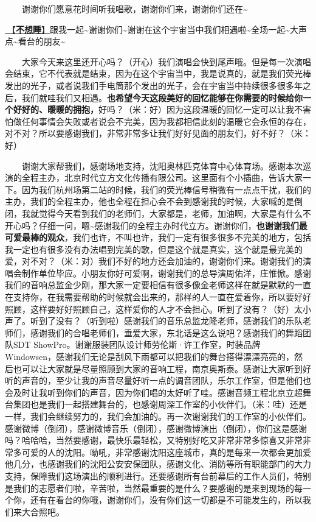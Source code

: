 \documentclass[]{ctexbook}
\begin{document}
  谢谢你们愿意花时间听我唱歌，谢谢你们来，谢谢你们还在\textasciitilde{}

\hyperref[donot-want-to-sleep]{🎵【\textbf{不想睡}】}跟我一起\textasciitilde 谢谢你们\textasciitilde 谢谢在这个宇宙当中我们相遇啦\textasciitilde 全场一起\textasciitilde 大声点\textasciitilde 看台的朋友\textasciitilde{}

  大家今天来这里还开心吗？（开心）我们演唱会快到尾声哦。但是每一次演唱会结束，它不代表就是结束，因为在这个宇宙当中，我是说真的，就是我们荧光棒发出的光子，或者说我们手电筒那个发出的光子，会在宇宙当中持续很多很多年之后，我们就哇我们又相遇。\textbf{也希望今天这段美好的回忆能够在你需要的时候给你一个好好的、暖暖的拥抱，}好吗？（米：好）因为这段温暖的回忆一定可以让我不害怕做任何事情会失败或者说会不完美，因为我都相信此刻的温暖它会永恒的存在，对不对？所以要感谢我们，非常非常多让我们好好见面的朋友们，好不好？（米：好）

  谢谢大家帮我们，感谢场地支持，沈阳奥林匹克体育中心体育场。感谢本次巡演的全程主办，北京时代立方文化传播有限公司。这里面有个小插曲，告诉大家一下。因为我们杭州场第二站的时候，我们的荧光棒信号稍微有一点点干扰，我们的主办，我们的全程主办，他也全程在担心会不会到感谢我的时候，大家喊的是倒闭，我就觉得今天看到我们的老师们，大家都是，老师，加油啊，大家是有什么不开心吗？仔细一问，嗯\textasciitilde 感谢我们的全程主办时代立方。谢谢你们，\textbf{也谢谢我们最可爱最棒的观众}，我们也许，不叫也许，我们一定有很多很多不完美的地方，包括我一定也有很多没有办法唱到完美的歌，但是这个就是真实，这个就是最完美的爱，对不对？（米：对）我们不好的地方还会加油的，谢谢你们来。谢谢我们的演唱会制作单位毕应。小朋友你好可爱啊，谢谢我们的总导演周佑洋，庄惟惞。感谢我们的音响总监金少刚，那大家一定要相信有很多像金老师这样在就是默默的一直在支持你，在我需要帮助的时候就会出来的，那样的人一直在爱着你，所以要好好照顾，这样要好好照顾自己，这样爱你的人才不会担心。听到了没有？（好）太小声了。听到了没有？（听到啦）感谢我们的音乐总监龙隆老师，感谢我们的乐队老师们，感谢我们的合唱老师们，垂爱大家，东北话是这么说吧？感谢我们的舞蹈团队SDT ShowPro。谢谢服装团队设计师劳伦斯·许工作室，时装品牌Windowsen，感谢我们无论是刮风下雨都可以把我们的舞台搭得漂漂亮亮的，然后也可以让大家就是尽量照顾到大家的音响工程，南京奥斯泰。感谢让大家听到好听的声音的，至少让我的声音尽量好听一点的调音团队，乐尔工作室，但是他们也会及时让我听到你们的声音，因为你们唱的太好听了哇。感谢音频工程北京立超舞台集团也是我们一起搭建舞台的，也感谢周深工作室的小伙伴们。（米：哇）还是一样，我们会继续努力的，我们会加油的。再一次谢谢我们的工作室的小伙伴们。感谢微博（倒闭），感谢微博音乐（倒闭），感谢微博演出（倒闭），你们这是感谢吗？哈哈哈，当然要感谢，最快乐最轻松，又特别好吃又非常非常多惊喜又非常非常多可爱的人的沈阳。呦吼，非常感谢沈阳这座城市，真的是每来一次都会更加爱他几分，也感谢我们的沈阳公安安保团队，感谢文化、消防等所有职能部门的大力支持，保障我们这场演出的顺利进行。还要感谢所有台前幕后的工作人员们，特别是我们的志愿者们啦，辛苦啦，当然最重要的是什么？要感谢的是来到现场的每一个你，还有在看台的你哦，谢谢你们，没有你们这一切都是不可能发生的，所以我们来大合照吧。
\end{document}
